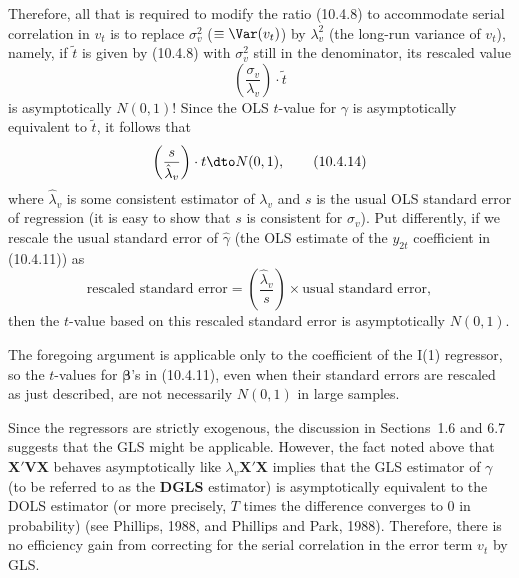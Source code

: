 Therefore, all that is required to modify the ratio (10.4.8) to accommodate
serial correlation in $v_t$ is to replace $\sigma_v^2$ ($\equiv \Var(v_t)$) by $\lambda_v^2$ (the long-run variance of
$v_t$), namely, if $\tilde{t}$ is given by (10.4.8) with $\sigma_v^2$ still in the denominator, its rescaled
value
\begin{equation}
  \left(\frac{\sigma_v}{\lambda_v}\right) \cdot \tilde{t}
  \label{eq:10.4.13} \tag{10.4.13}
\end{equation}
is asymptotically $N(0, 1)$! Since the OLS $t$-value for $\gamma$ is asymptotically equivalent
to $\tilde{t}$, it follows that
\begin{equation}
  \left(\frac{s}{\hat{\lambda}_v}\right) \cdot t \dto N(0, 1),
  \label{eq:10.4.14} \tag{10.4.14}
\end{equation}
where $\hat{\lambda}_v$ is some consistent estimator of $\lambda_v$ and $s$ is the usual OLS standard error
of regression (it is easy to show that $s$ is consistent for $\sigma_v$). Put differently, if we
rescale the usual standard error of $\hat{\gamma}$ (the OLS estimate of the $y_{2t}$ coefficient in
(10.4.11)) as
\begin{equation}
  \text{rescaled standard error}
  = \left(\frac{\hat{\lambda}_v}{s}\right) \times \text{usual standard error},
  \label{eq:10.4.15} \tag{10.4.15}
\end{equation}
then the $t$-value based on this rescaled standard error is asymptotically $N(0, 1)$.

The foregoing argument is applicable only to the coefficient of the I(1) regres\-sor,
so the $t$-values for $\boldsymbol{\beta}$'s in (10.4.11), even when their standard errors are rescaled
as just described, are not necessarily $N(0, 1)$ in large samples.

Since the regressors are strictly exogenous, the discussion in Sections~1.6 and
6.7 suggests that the GLS might be applicable. However, the fact noted above that
$\mathbf{X}'\mathbf{V}\mathbf{X}$ behaves asymptotically like $\lambda_v\mathbf{X}'\mathbf{X}$ implies that the GLS estimator of
$\gamma$ (to
be referred to as the \textbf{DGLS} estimator) is asymptotically equivalent to the DOLS
estimator (or more precisely, $T$ times the difference converges to 0 in probability)
(see Phillips, 1988, and Phillips and Park, 1988). Therefore, there is no efficiency
gain from correcting for the serial correlation in the error term $v_t$ by GLS.

